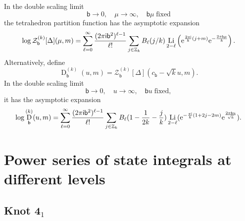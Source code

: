 \documentclass[a4paper,11pt]{article}	%
\DeclareMathOperator{\Li}{Li}
\def\mc{\mathcal}
\def\md{\mathbf}
\def\ms{\mathsf}
\def\IZ{\mathbb{Z}}
\newcommand{\re}{{\rm e}}
\newcommand{\ri}{{\mathsf{i}}}
\newcommand{\bb}{\ms{b}}
\newcommand{\knot}[1]{\md{#1}}
\DeclareMathOperator{\DD}{\text{D}}
\begin{document}
In the double scaling limit
\begin{equation}
  \bb\rightarrow 0,\quad \mu\rightarrow \infty,\quad \bb\mu\;\text{fixed}
\end{equation}
the tetrahedron partition function has the asymptotic expansion
\begin{equation}
  \log \mc{Z}_\bb^{(k)}[\Delta](\mu,m) =
  \sum_{\ell=0}^\infty \frac{(2\pi\ri\bb^2)^{\ell-1}}{\ell!}
  \sum_{j\in\IZ_k}B_\ell(j/k)\Li_{2-\ell}\left(
    \re^{\frac{2\pi\ri}{k}(j+m)}\re^{-\frac{2\pi\bb\mu}{k}}
  \right).
  \label{eq:ZDasymp}
\end{equation}
Alternatively, define
\begin{equation}
  \DD_\bb^{(k)}(u,m) = \mc{Z}_\bb^{(k)}[\Delta](c_\bb-\sqrt{k}u,m).
\end{equation}
In the double scaling limit
\begin{equation}
  \bb\rightarrow 0,\quad u\rightarrow \infty,\quad \bb u\;\text{fixed},
\end{equation}
it has the asymptotic expansion
\begin{equation}
  \log \DD_\bb^{(k)}(u,m) = \sum_{\ell=0}^\infty
  \frac{(2\pi\ri\bb^2)^{\ell-1}}{\ell!}\sum_{j\in\IZ_k}
  B_\ell(1-\frac{1}{2k}-\frac{j}{k})
  \Li_{2-\ell}(\re^{-\frac{\pi\ri}{k}(1+2j-2m)}\re^{\frac{2\pi\bb
      u}{\sqrt{k}}}).
  \label{eq:Dbasymp}
\end{equation}

\section{Power series of state integrals at different levels}

\subsection{Knot $\knot{4}_1$}
\label{sc:phi.41}
\end{document}
